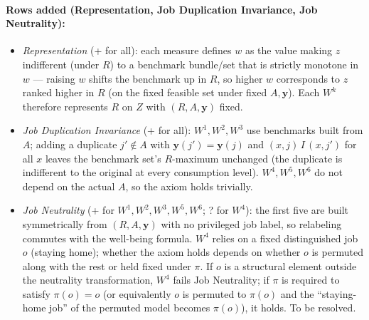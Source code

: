 \documentclass[12pt,thmsb]{article}
\begin{document}
\paragraph{Rows added (Representation, Job Duplication Invariance, Job Neutrality):}
\begin{itemize}
    \item \emph{Representation} (+ for all): each measure defines $w$ as the value making $z$ indifferent (under $R$) to a benchmark bundle/set that is strictly monotone in $w$ --- raising $w$ shifts the benchmark up in $R$, so higher $w$ corresponds to $z$ ranked higher in $R$ (on the fixed feasible set under fixed $A,\mathbf y$). Each $W^k$ therefore represents $R$ on $Z$ with $(R,A,\mathbf y)$ fixed.
    \item \emph{Job Duplication Invariance} (+ for all): $W^1,W^2,W^3$ use benchmarks built from $A$; adding a duplicate $j'\notin A$ with $\mathbf y(j')=\mathbf y(j)$ and $(x,j)\,I\,(x,j')$ for all $x$ leaves the benchmark set's $R$-maximum unchanged (the duplicate is indifferent to the original at every consumption level). $W^4,W^5,W^6$ do not depend on the actual $A$, so the axiom holds trivially.
    \item \emph{Job Neutrality} (+ for $W^1,W^2,W^3,W^5,W^6$; ? for $W^4$): the first five are built symmetrically from $(R,A,\mathbf y)$ with no privileged job label, so relabeling commutes with the well-being formula. $W^4$ relies on a fixed distinguished job $o$ (staying home); whether the axiom holds depends on whether $o$ is permuted along with the rest or held fixed under $\pi$. If $o$ is a structural element outside the neutrality transformation, $W^4$ fails Job Neutrality; if $\pi$ is required to satisfy $\pi(o)=o$ (or equivalently $o$ is permuted to $\pi(o)$ and the ``staying-home job'' of the permuted model becomes $\pi(o)$), it holds. To be resolved.
\end{itemize}
\end{document}
